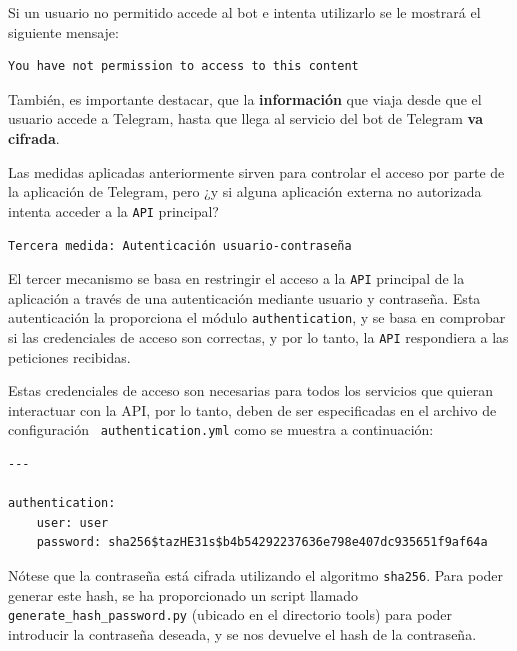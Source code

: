 \vspace{-0.5cm}


Si un usuario no permitido accede al bot e intenta utilizarlo se le mostrará el siguiente mensaje:

\vspace{-0.5cm}

\begin{verbatim}
You have not permission to access to this content
\end{verbatim}

\vspace{-0.5cm}

También, es importante destacar, que la \textbf{información} que viaja desde que el usuario accede a Telegram, hasta que llega al servicio del bot de Telegram \textbf{va cifrada}.

Las medidas aplicadas anteriormente sirven para controlar el acceso por parte de la aplicación de Telegram, pero ¿y si alguna aplicación externa no autorizada intenta acceder a la \texttt{API} principal?

\texttt{Tercera medida: Autenticación usuario-contraseña}

El tercer mecanismo se basa en restringir el acceso a la \texttt{API} principal de la aplicación a través de una autenticación mediante usuario y contraseña. Esta autenticación la proporciona el módulo \texttt{authentication}, y se basa en comprobar si las credenciales de acceso son correctas, y por lo tanto, la \texttt{API} respondiera a las peticiones recibidas.

Estas credenciales de acceso son necesarias para todos los servicios que quieran interactuar con la API, por lo tanto, deben de ser especificadas en el archivo de configuración \texttt{ 	authentication.yml} como se muestra a continuación:

\vspace{-0.5cm}

\begin{verbatim}
---

authentication:
    user: user
    password: sha256$tazHE31s$b4b54292237636e798e407dc935651f9af64a

\end{verbatim}

\vspace{-1cm}

Nótese que la contraseña está cifrada utilizando el algoritmo \texttt{sha256}. Para poder generar este hash, se ha proporcionado un script llamado \texttt{generate\_hash\_password.py} (ubicado en el directorio tools) para poder introducir la contraseña deseada, y se nos devuelve el hash de la contraseña.

